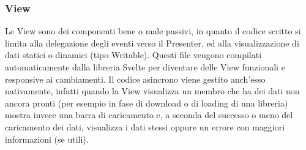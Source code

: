     \subsubsection{View}
        Le View sono dei componenti bene o male passivi, in quanto il codice scritto si limita alla delegazione degli eventi verso il Presenter, ed alla visualizzazione di dati statici o dinamici (tipo Writable). 
        Questi file vengono compilati automaticamente dalla libreria Svelte per diventare delle View funzionali e responsive ai cambiamenti.
        Il codice asincrono viene gestito anch'esso nativamente, infatti quando la View visualizza un membro che ha dei dati non ancora pronti (per esempio in fase di download o di loading di una libreria) mostra invece una barra di caricamento e,
        a seconda del successo o meno del caricamento dei dati, visualizza i dati stessi oppure un errore con maggiori informazioni (se utili).

